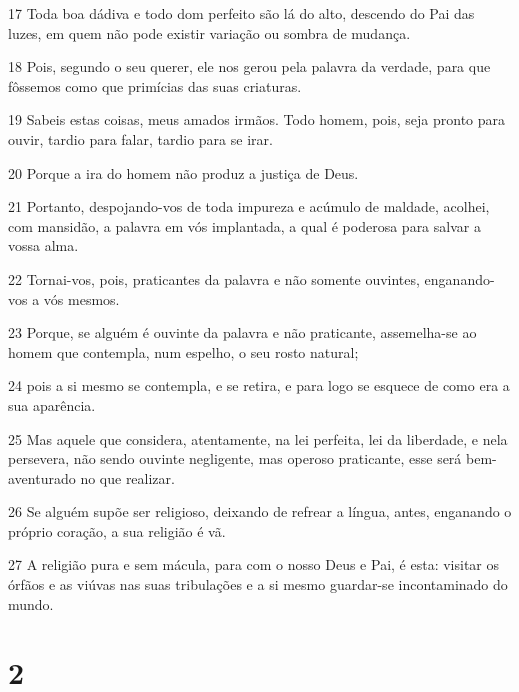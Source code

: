 \par 17 Toda boa dádiva e todo dom perfeito são lá do alto, descendo do Pai das luzes, em quem não pode existir variação ou sombra de mudança.
\par 18 Pois, segundo o seu querer, ele nos gerou pela palavra da verdade, para que fôssemos como que primícias das suas criaturas.
\par 19 Sabeis estas coisas, meus amados irmãos. Todo homem, pois, seja pronto para ouvir, tardio para falar, tardio para se irar.
\par 20 Porque a ira do homem não produz a justiça de Deus.
\par 21 Portanto, despojando-vos de toda impureza e acúmulo de maldade, acolhei, com mansidão, a palavra em vós implantada, a qual é poderosa para salvar a vossa alma.
\par 22 Tornai-vos, pois, praticantes da palavra e não somente ouvintes, enganando-vos a vós mesmos.
\par 23 Porque, se alguém é ouvinte da palavra e não praticante, assemelha-se ao homem que contempla, num espelho, o seu rosto natural;
\par 24 pois a si mesmo se contempla, e se retira, e para logo se esquece de como era a sua aparência.
\par 25 Mas aquele que considera, atentamente, na lei perfeita, lei da liberdade, e nela persevera, não sendo ouvinte negligente, mas operoso praticante, esse será bem-aventurado no que realizar.
\par 26 Se alguém supõe ser religioso, deixando de refrear a língua, antes, enganando o próprio coração, a sua religião é vã.
\par 27 A religião pura e sem mácula, para com o nosso Deus e Pai, é esta: visitar os órfãos e as viúvas nas suas tribulações e a si mesmo guardar-se incontaminado do mundo.

\chapter{2}

